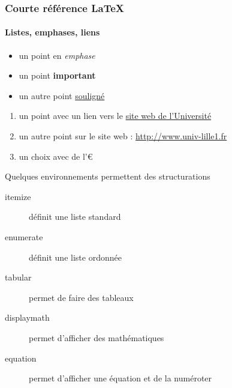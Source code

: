 
\begin{frame}
  \frametitle{Courte référence \LaTeX{}}
  \framesubtitle{Listes, emphases, liens}

  
  \begin{itemize}
  \item un point en \emph{emphase}
  \item un point \textbf{important}
  \item un autre point \underline{souligné}
  \end{itemize} 
  
  \pause  
  
  
  \begin{enumerate}
  \item un point avec un lien vers le \href{http://www.univ-lille1.fr}{site web de l'Université}
  \item un autre point sur le site web : \url{http://www.univ-lille1.fr}
  \item un choix avec de l'€
  \end{enumerate}

  \pause


  Quelques environnements permettent des structurations 

  \begin{description}
  \item[itemize] définit une liste standard
  \item[enumerate] définit une liste ordonnée
  \item[tabular] permet de faire des tableaux
  \item[displaymath] permet d'afficher des mathématiques
  \item[equation] permet d'afficher une équation et de la numéroter
  \end{description}
\end{frame}


